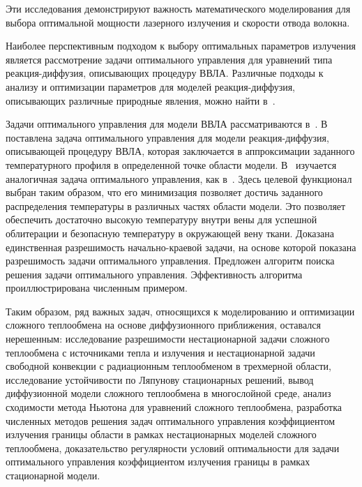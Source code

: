 Эти исследования демонстрируют важность математического моделирования
для выбора оптимальной мощности лазерного излучения и скорости отвода волокна.

Наиболее перспективным подходом к выбору оптимальных параметров
излучения является рассмотрение задачи оптимального управления
для уравнений типа реакция-диффузия, описывающих процедуру ВВЛА\@.
Различные подходы к анализу и оптимизации параметров для моделей реакция-диффузия,
описывающих различные природные явления, можно найти в~\cite{
Stability_Alekseev2016, Optimization_Brizitskii2018,
chebotarev2018inverse, Theoretical_Maslovskaya2021,
}.

Задачи оптимального управления для модели ВВЛА рассматриваются
в~\cite{Optimal_Kovtanyuk2020, Inverse_Kovtanyuk2021}.
В~\cite{Optimal_Kovtanyuk2020} поставлена задача оптимального управления для модели реакция-диффузия,
описывающей процедуру ВВЛА, которая заключается в аппроксимации заданного
температурного профиля в определенной точке области модели.
В~\cite{Inverse_Kovtanyuk2021} изучается аналогичная задача оптимального управления,
как в~\cite{Optimal_Kovtanyuk2020}.
Здесь целевой функционал выбран таким образом, что его минимизация позволяет
достичь заданного распределения температуры в различных частях области модели.
Это позволяет обеспечить достаточно высокую температуру внутри
вены для успешной облитерации и безопасную температуру в окружающей вену ткани.
Доказана единственная разрешимость начально-краевой задачи,
на основе которой показана разрешимость задачи оптимального управления.
Предложен алгоритм поиска решения задачи оптимального управления.
Эффективность алгоритма проиллюстрирована численным примером.



Таким образом, ряд важных задач, относящихся к моделированию и
оптимизации сложного теплообмена на основе
диффузионного приближения, оставался нерешенным: исследование
разрешимости нестационарной задачи сложного
теплообмена с источниками тепла и излучения и нестационарной задачи
свободной конвекции с радиационным теплообменом в трехмерной
области, исследование устойчивости по Ляпунову стационарных решений,
вывод диффузионной модели сложного теплообмена в многослойной среде,
анализ сходимости метода Ньютона
для уравнений сложного теплообмена, разработка численных
методов решения задач оптимального управления
коэффициентом излучения границы области в рамках нестационарных моделей
сложного теплообмена, доказательство регулярности
условий оптимальности для задачи оптимального управления коэффициентом
излучения границы в рамках стационарной модели.

